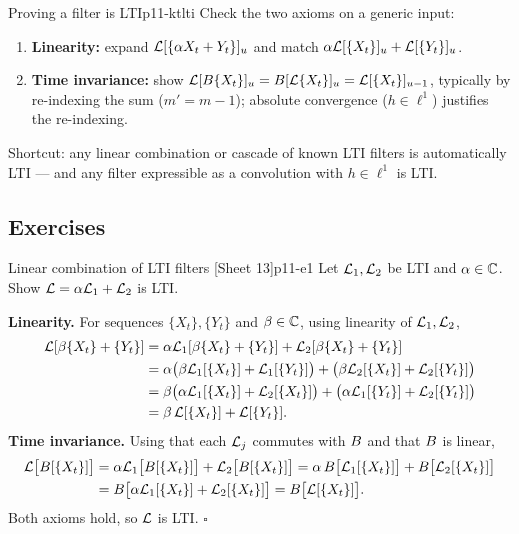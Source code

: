 \begin{keytech}{Proving a filter is LTI}{p11-ktlti}
Check the two axioms on a generic input:
\begin{enumerate}
  \item \textbf{Linearity:} expand $\mathcal{L}[\{\alpha X_t+Y_t\}]_u$ and match
        $\alpha\mathcal{L}[\{X_t\}]_u+\mathcal{L}[\{Y_t\}]_u$.
  \item \textbf{Time invariance:} show $\mathcal{L}[B\{X_t\}]_u=B[\mathcal{L}\{X_t\}]_u
        =\mathcal{L}[\{X_t\}]_{u-1}$, typically by re-indexing the sum
        ($m'=m-1$); absolute convergence ($h\in\ell^1$) justifies the
        re-indexing.
\end{enumerate}
Shortcut: any linear combination or cascade of known LTI filters is automatically
LTI --- and any filter expressible as a convolution with $h\in\ell^1$ is LTI.
\end{keytech}

\subsection{Exercises}

\begin{exercise}{Linear combination of LTI filters \quad\textnormal{[Sheet 13]}}{p11-e1}
Let $\mathcal{L}_1,\mathcal{L}_2$ be LTI and $\alpha\in\mathbb{C}$. Show
$\mathcal{L}=\alpha\mathcal{L}_1+\mathcal{L}_2$ is LTI.
\end{exercise}
\begin{solution}
\textbf{Linearity.} For sequences $\{X_t\},\{Y_t\}$ and $\beta\in\mathbb{C}$, using
linearity of $\mathcal{L}_1,\mathcal{L}_2$,
\[
\begin{aligned}
\mathcal{L}[\beta\{X_t\}+\{Y_t\}]
&=\alpha\mathcal{L}_1[\beta\{X_t\}+\{Y_t\}]+\mathcal{L}_2[\beta\{X_t\}+\{Y_t\}]\\
&=\alpha\big(\beta\mathcal{L}_1[\{X_t\}]+\mathcal{L}_1[\{Y_t\}]\big)
 +\big(\beta\mathcal{L}_2[\{X_t\}]+\mathcal{L}_2[\{Y_t\}]\big)\\
&=\beta\big(\alpha\mathcal{L}_1[\{X_t\}]+\mathcal{L}_2[\{X_t\}]\big)
 +\big(\alpha\mathcal{L}_1[\{Y_t\}]+\mathcal{L}_2[\{Y_t\}]\big)\\
&=\beta\,\mathcal{L}[\{X_t\}]+\mathcal{L}[\{Y_t\}].
\end{aligned}
\]
\textbf{Time invariance.} Using that each $\mathcal{L}_j$ commutes with $B$ and that
$B$ is linear,
\[
\begin{aligned}
\mathcal{L}\big[B[\{X_t\}]\big]
&=\alpha\mathcal{L}_1\big[B[\{X_t\}]\big]+\mathcal{L}_2\big[B[\{X_t\}]\big]
 =\alpha\,B\big[\mathcal{L}_1[\{X_t\}]\big]+B\big[\mathcal{L}_2[\{X_t\}]\big]\\
&=B\big[\alpha\mathcal{L}_1[\{X_t\}]+\mathcal{L}_2[\{X_t\}]\big]
 =B\big[\mathcal{L}[\{X_t\}]\big].
\end{aligned}
\]
Both axioms hold, so $\mathcal{L}$ is LTI. \hfill$\square$
\end{solution}

